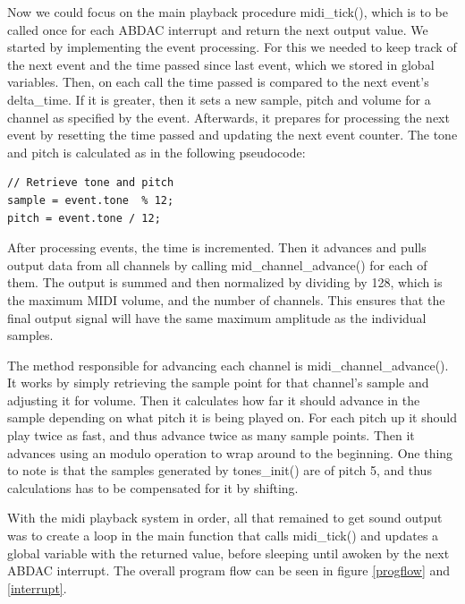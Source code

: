 \documentclass[a4paper,12pt]{article}
\begin{document}
Now we could focus on the main playback procedure midi\_tick(), which is to be called once for each ABDAC interrupt and return the next output value. We started by implementing the event processing. For this we needed to keep track of the next event and the time passed since last event, which we stored in global variables. Then, on each call the time passed is compared to the next event’s delta\_time. If it is greater, then it sets a new sample, pitch and volume for a channel as specified by the event. Afterwards, it prepares for processing the next event by resetting the time passed and updating the next event counter. The tone and pitch is calculated as in the following pseudocode:

\begin{verbatim}
// Retrieve tone and pitch
sample = event.tone  % 12;
pitch = event.tone / 12;
\end{verbatim}

After processing events, the time is incremented. Then it advances and pulls output data from all channels by calling mid\_channel\_advance() for each of them. The output is summed and then normalized by dividing by 128, which is the maximum MIDI volume, and the number of channels. This ensures that the final output signal will have the same maximum amplitude as the individual samples.

The method responsible for advancing each channel is midi\_channel\_advance(). It works by simply retrieving the sample point for that channel’s sample and adjusting it for volume. Then it calculates how far it should advance in the sample depending on what pitch it is being played on. For each pitch up it should play twice as fast, and thus advance twice as many sample points. Then it advances using an modulo operation to wrap around to the beginning. One thing to note is that the samples generated by tones\_init() are of pitch 5, and thus calculations has to be compensated for it by shifting.

With the midi playback system in order, all that remained to get sound output was to create a loop in the main function that calls midi\_tick() and updates a global variable with the returned value, before sleeping until awoken by the next ABDAC interrupt. The overall program flow can be seen in figure \ref{progflow} and \ref{interrupt}.
\end{document}
